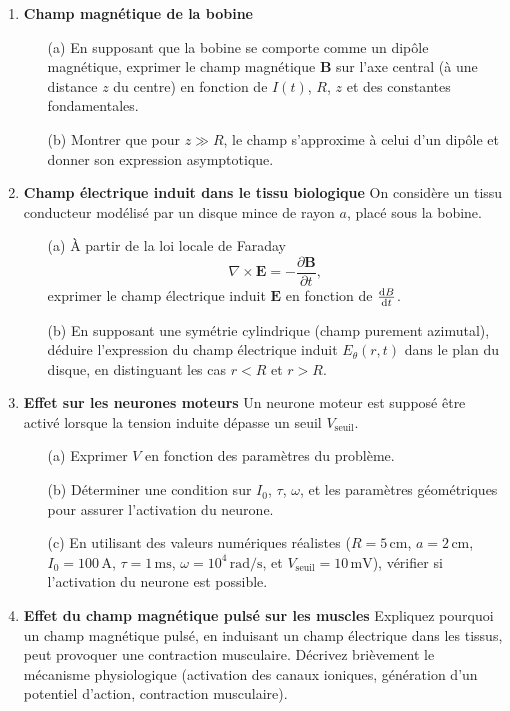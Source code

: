 \documentclass[a4paper,10pt]{report}
\begin{document}
	\begin{enumerate}
		\item \textbf{Champ magnétique de la bobine}
		\begin{enumerate}
			\item[(a)] En supposant que la bobine se comporte comme un dipôle magnétique, exprimer le champ magnétique $\mathbf{B}$ sur l'axe central (à une distance $z$ du centre) en fonction de $I(t)$, $R$, $z$ et des constantes fondamentales.
			\item[(b)] Montrer que pour $z \gg R$, le champ s'approxime à celui d'un dipôle et donner son expression asymptotique.
		\end{enumerate}
		
		\item \textbf{Champ électrique induit dans le tissu biologique}  
		On considère un tissu conducteur modélisé par un disque mince de rayon $a$, placé sous la bobine.
		\begin{enumerate}
			\item[(a)] À partir de la loi locale de Faraday
			\[
			\nabla \times \mathbf{E} = -\frac{\partial \mathbf{B}}{\partial t},
			\]
			exprimer le champ électrique induit $\mathbf{E}$ en fonction de $\frac{\text dB}{\text dt}$.
			\item[(b)] En supposant une symétrie cylindrique (champ purement azimutal), déduire l'expression du champ électrique induit $E_\theta(r,t)$ dans le plan du disque, en distinguant les cas $r<R$ et $r>R$.
		\end{enumerate}
		
		\item \textbf{Effet sur les neurones moteurs}  
		Un neurone moteur est supposé être activé lorsque la tension induite dépasse un seuil $V_\text{seuil}$.
		\begin{enumerate}
			\item[(a)] Exprimer $V$ en fonction des paramètres du problème.
			\item[(b)] Déterminer une condition sur $I_0$, $\tau$, $\omega$, et les paramètres géométriques pour assurer l'activation du neurone.
			\item[(c)] En utilisant des valeurs numériques réalistes ($R = 5\,\text{cm}$, $a = 2\,\text{cm}$, $I_0 = 100\,\text{A}$, $\tau = 1\,\text{ms}$, $\omega = 10^4\,\text{rad/s}$, et $V_{\text{seuil}} = 10\,\text{mV}$), vérifier si l'activation du neurone est possible.
		\end{enumerate}
		
		\item \textbf{Effet du champ magnétique pulsé sur les muscles}  
		Expliquez pourquoi un champ magnétique pulsé, en induisant un champ électrique dans les tissus, peut provoquer une contraction musculaire. Décrivez brièvement le mécanisme physiologique (activation des canaux ioniques, génération d'un potentiel d'action, contraction musculaire).
	\end{enumerate}
	
\end{document}

